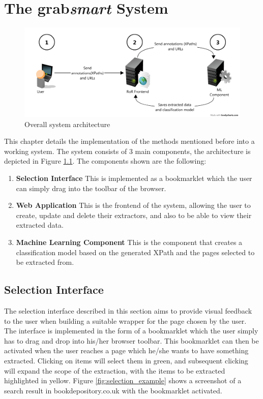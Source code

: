 \chapter{The grab\textit{smart} System}
\label{chap:implementation}

\begin{figure}[htbp]
\centering
\includegraphics[scale=0.43]{implementation.png} 
\caption{Overall system architecture}
\label{fig:systemarchitecture}
\end{figure}


\label{chap:selection}
This chapter details the implementation of the methods mentioned before into a working system.
The system consists of 3 main components, the architecture is depicted in Figure \ref{fig:systemarchitecture}.
The components shown are the following:

\begin{enumerate}
	\item \textbf{Selection Interface}
	This is implemented as a bookmarklet which the user can simply drag into the toolbar of the browser.
	\item \textbf{Web Application}
	This is the frontend of the system, allowing the user to create, update and delete their extractors,
	and also to be able to view their extracted data.
	\item \textbf{Machine Learning Component}
	This is the component that creates a classification model based on the generated XPath and the pages selected to be extracted from.
\end{enumerate}


\section{Selection Interface}
The selection interface described in this section aims to provide visual feedback to the user
when building a suitable wrapper for the page chosen by the user. The interface is implemented
in the form of a bookmarklet which the user simply has to drag and drop into his/her browser
toolbar. This bookmarklet can then be activated when the user reaches a page which he/she wants
to have something extracted. Clicking on items will select them in green, and subsequent clicking
will expand the scope of the extraction, with the items to be extracted highlighted in yellow.
Figure \ref{fig:selection_example} shows a screenshot of a search result in bookdepository.co.uk
with the bookmarklet activated.

